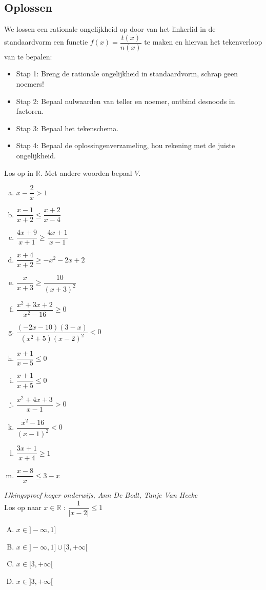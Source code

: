 \documentclass[12pt,twoside,a4paper]{article}
\begin{document}
\subsection{Oplossen}

We lossen een rationale ongelijkheid op door van het linkerlid in de standaardvorm een functie $f(x)=\dfrac{t(x)}{n(x)}$ te maken en hiervan het tekenverloop van te bepalen:
\begin{itemize}
\item Stap 1: Breng de rationale ongelijkheid in standaardvorm, schrap geen noemers!
\item Stap 2: Bepaal nulwaarden van teller en noemer, ontbind desnoods in factoren.
\item Stap 3: Bepaal het tekenschema.
\item Stap 4: Bepaal de oplossingenverzameling, hou rekening met de juiste ongelijkheid.
\end{itemize}

\begin{oefening}
Los op in $\mathbb{R}$. Met andere woorden bepaal $V$.
\begin{multicols}{2}
\begin{enumerate}[(a)]
  \itemsep.5em
  \item $x-\dfrac{2}{x}>1$
  \item $\dfrac{x-1}{x+2}\leq\dfrac{x+2}{x-4}$
  \item $\dfrac{4x+9}{x+1}\geq\dfrac{4x+1}{x-1}$
  \item $\dfrac{x+4}{x+2}\geq -x^2-2x+2$
  \item $\dfrac{x}{x+3}\geq\dfrac{10}{(x+3)^2}$
  \item $\dfrac{x^2+3x+2}{x^2-16}\geq0$
  \item $\dfrac{(-2x-10)(3-x)}{(x^2+5)(x-2)^2}<0$
  \item $\dfrac{x+1}{x-5}\leq 0$
  \item $\dfrac{x+1}{x+5}\leq 0$
  \item $\dfrac{x^2+4x+3}{x-1}>0$
  \item $\dfrac{x^2-16}{(x-1)^2}<0$
  \item $\dfrac{3x+1}{x+4}\geq 1$
  \item $\dfrac{x-8}{x}\leq 3-x$
\end{enumerate}
\end{multicols}
\end{oefening}

\begin{oefening}{\scriptsize\em IJkingsproef hoger onderwijs, Ann De Bodt, Tanje Van Hecke}\\
Los op naar $x\in\mathbb{R}$ : $\dfrac{1}{|x-2|}\leq 1$\\
\begin{enumerate}[(A)]
  \itemsep.5em
  \item $x\in]-\infty, 1]$
  \item $x\in]-\infty, 1]\cup[3,+\infty[$
  \item $x\in[3,+\infty[$
  \item $x\in]3,+\infty[$
\end{enumerate}
\end{oefening}
\end{document}
